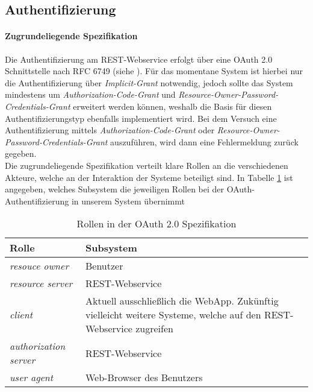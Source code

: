 \subsection{Authentifizierung}
\label{subsec:api-auth}
\paragraph{Zugrundeliegende Spezifikation} Die Authentifizierung am REST-Webservice erfolgt über eine OAuth 2.0 Schnittstelle nach RFC 6749 (siehe \cite{rfc6749}).
Für das momentane System ist hierbei nur die Authentifizierung über \textit{Implicit-Grant} \cite[Kap. 4.2]{rfc6749} notwendig, jedoch sollte das System mindestens um \textit{Authorization-Code-Grant} \cite[Kap. 4.1]{rfc6749} und \textit{Resource-Owner-Password-Credentials-Grant} \cite[Kap. 4.3]{rfc6749} erweitert werden können, weshalb die Basis für diesen Authentifizierungstyp ebenfalls implementiert wird. Bei dem Versuch eine Authentifizierung mittels \textit{Authorization-Code-Grant} oder \textit{Resource-Owner-Password-Credentials-Grant} auszuführen, wird dann eine Fehlermeldung zurück gegeben.\\
Die zugrundeliegende Spezifikation verteilt klare Rollen an die verschiedenen Akteure, welche an der Interaktion der Systeme beteiligt sind. In Tabelle \ref{tab:api-auth-roles} ist angegeben, welches Subsystem die jeweiligen Rollen bei der OAuth-Authentifizierung in unserem System übernimmt

\begin{table}
	\begin{tabularx}{\textwidth}{@{} | X | X | @{}}
		\hline
		\textbf{Rolle} & \textbf{Subsystem}\\ \hline \hline
		\textit{resouce owner} & Benutzer \\ \hline
		\textit{resource server} & REST-Webservice \\ \hline
		\textit{client} & Aktuell ausschließlich die WebApp. Zukünftig vielleicht weitere Systeme, welche auf den REST-Webservice zugreifen \\ \hline
		\textit{authorization server} & REST-Webservice \\ \hline
		\textit{user agent} & Web-Browser des Benutzers \\
		\hline
	\end{tabularx}
	\caption{Rollen in der OAuth 2.0 Spezifikation}
	\label{tab:api-auth-roles}
\end{table}

